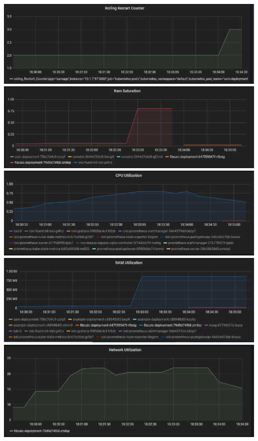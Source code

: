 \documentclass[a4paper,10pt]{scrartcl}
\begin{document}
\begin{description}
\begin{minipage}{\linewidth}
            \includegraphics[width=.5\textwidth]{img/RAMCPUAnomalie/RollingRestart.PNG}
            \includegraphics[scale=1,width=.5\textwidth,height=.14\textheight]{img/RAMCPUAnomalie/RAMSaturation.PNG}
  			\includegraphics[scale=1,width=.5\textwidth]{img/RAMCPUAnomalie/CPUUtilization.PNG}
  			\includegraphics[scale=1,width=.5\textwidth]{img/RAMCPUAnomalie/RAMUtilization.PNG}
  			\includegraphics[scale=1,width=.5\textwidth]{img/RAMCPUAnomalie/Netzwerk.PNG}
\end{minipage}


\end{description}
\end{document}
